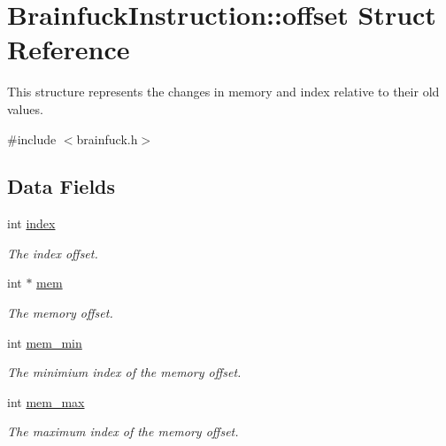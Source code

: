 \hypertarget{structBrainfuckInstruction_1_1offset}{}\section{Brainfuck\+Instruction\+:\+:offset Struct Reference}
\label{structBrainfuckInstruction_1_1offset}


This structure represents the changes in memory and index relative to their old values.  




{\ttfamily \#include $<$brainfuck.\+h$>$}

\subsection*{Data Fields}
\begin{DoxyCompactItemize}
\item 
\hypertarget{structBrainfuckInstruction_1_1offset_ae8bb010062d5302aa8e6326e4a0e5340}{}int \hyperlink{structBrainfuckInstruction_1_1offset_ae8bb010062d5302aa8e6326e4a0e5340}{index}\label{structBrainfuckInstruction_1_1offset_ae8bb010062d5302aa8e6326e4a0e5340}

\begin{DoxyCompactList}\small\item\em The index offset. \end{DoxyCompactList}\item 
\hypertarget{structBrainfuckInstruction_1_1offset_a2aff7ce455116c9aa759593ed0d7198a}{}int $\ast$ \hyperlink{structBrainfuckInstruction_1_1offset_a2aff7ce455116c9aa759593ed0d7198a}{mem}\label{structBrainfuckInstruction_1_1offset_a2aff7ce455116c9aa759593ed0d7198a}

\begin{DoxyCompactList}\small\item\em The memory offset. \end{DoxyCompactList}\item 
\hypertarget{structBrainfuckInstruction_1_1offset_a12965b10b53e07906d7edab31e4c9d4a}{}int \hyperlink{structBrainfuckInstruction_1_1offset_a12965b10b53e07906d7edab31e4c9d4a}{mem\+\_\+min}\label{structBrainfuckInstruction_1_1offset_a12965b10b53e07906d7edab31e4c9d4a}

\begin{DoxyCompactList}\small\item\em The minimium index of the memory offset. \end{DoxyCompactList}\item 
\hypertarget{structBrainfuckInstruction_1_1offset_aabd3374db83143b52ebddf869f679fb5}{}int \hyperlink{structBrainfuckInstruction_1_1offset_aabd3374db83143b52ebddf869f679fb5}{mem\+\_\+max}\label{structBrainfuckInstruction_1_1offset_aabd3374db83143b52ebddf869f679fb5}

\begin{DoxyCompactList}\small\item\em The maximum index of the memory offset. \end{DoxyCompactList}\end{DoxyCompactItemize}


